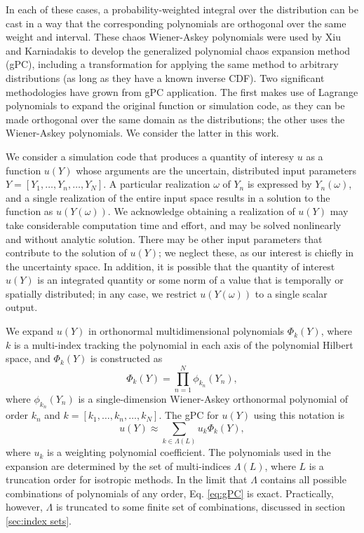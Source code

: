 In each of these cases, a probability-weighted
integral over the distribution can be cast in a way that the corresponding polynomials are orthogonal over the
same weight and interval.  These chaos Wiener-Askey polynomials were used by Xiu and Karniadakis to develop
the generalized polynomial chaos expansion method (gPC), including a transformation for applying the same
method to arbitrary distributions (as long as they have a known inverse CDF)\cite{xiu}.  Two significant
methodologies have grown from gPC application.  The first makes use of Lagrange polynomials to expand the
original function or simulation code, as they can be made orthogonal over the same domain as the
distributions\cite{SCLagrange}; the other uses the Wiener-Askey polynomials\cite{xiu}.  We consider the latter in this work.

We consider a simulation code that produces a quantity of interesy $u$ as a function $u(Y)$ whose arguments are the uncertain, distributed input
parameters $Y=[Y_1,\ldots,Y_n,\ldots,Y_N]$.  A particular realization $\omega$ of $Y_n$ is expressed by
$Y_n(\omega)$, and a single realization of the entire input space results in a solution to the function as
$u(Y(\omega))$.  We acknowledge obtaining a realization of $u(Y)$ may take considerable computation time and
effort, and may be solved nonlinearly and without analytic solution.  There may be other input parameters that
contribute to the solution of $u(Y)$; we neglect these, as our interest is chiefly in the uncertainty space.
In addition, it is possible that the quantity of interest $u(Y)$ is an integrated quantity or some norm of a
value that is temporally or spatially distributed; in any case, we restrict $u(Y(\omega))$ to a single scalar
output.

We expand $u(Y)$ in orthonormal multidimensional polynomials $\Phi_k(Y)$, where $k$ is a multi-index tracking
the polynomial in each axis of the polynomial Hilbert space, and $\Phi_k(Y)$ is constructed as
\begin{equation}\label{eq:gPC}
  \Phi_k(Y) = \prod_{n=1}^N \phi_{k_n}(Y_n),
\end{equation}
where $\phi_{k_n}(Y_n)$ is a single-dimension Wiener-Askey orthonormal polynomial of order $k_n$ and
$k=[k_1,\ldots,k_n,\ldots,k_N]$.  The gPC for $u(Y)$ using this notation is
\begin{equation}
  u(Y) \approx \sum_{k\in\Lambda(L)} u_k\Phi_k(Y),
\end{equation}
where $u_k$ is a weighting polynomial coefficient. The polynomials used in the expansion are determined
by the set of multi-indices $\Lambda(L)$, where $L$ is a truncation order for isotropic methods.  In the limit
that $\Lambda$ contains all possible combinations of polynomials of any order, Eq. \ref{eq:gPC} is exact.
Practically, however, $\Lambda$ is truncated to some finite set of combinations, discussed in section
\ref{sec:index sets}.

